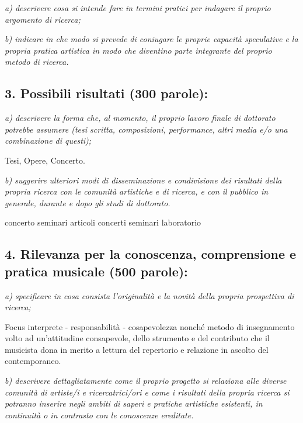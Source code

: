 \documentclass{gs-adonis}
\begin{document}
\emph{a) descrivere cosa si intende fare in termini pratici per indagare il proprio argomento di ricerca;}

\emph{b) indicare in che modo si prevede di coniugare le proprie capacità speculative e la propria pratica artistica in modo che diventino parte integrante del proprio metodo di ricerca.}

\subsection{3. Possibili risultati (300 parole):}

\emph{a) descrivere la forma che, al momento, il proprio lavoro finale di dottorato potrebbe assumere (tesi scritta, composizioni, performance, altri media e/o una combinazione di questi);}

Tesi, Opere, Concerto.

\emph{b) suggerire ulteriori modi di disseminazione e condivisione dei risultati della propria ricerca con le comunità artistiche e di ricerca, e con il pubblico in generale, durante e dopo gli studi di dottorato.}

concerto
seminari
articoli
concerti seminari
laboratorio

\subsection{4. Rilevanza per la conoscenza, comprensione e pratica musicale (500 parole):}

\emph{a) specificare in cosa consista l’originalità e la novità della propria prospettiva di ricerca;}

Focus interprete - responsabilità - cosapevolezza
nonché metodo di insegnamento volto ad un'attitudine consapevole, dello strumento e del
contributo che il musicista dona in merito a lettura del repertorio e relazione in ascolto
del contemporaneo.

\emph{b) descrivere dettagliatamente come il proprio progetto si relaziona alle diverse comunità di artiste/i e ricercatrici/ori e come i risultati della propria ricerca si potranno inserire negli ambiti di saperi e pratiche artistiche esistenti, in continuità o in contrasto con le conoscenze ereditate.}

\raggedright
\nocite{*}
%
\printbibliography
\end{document}
